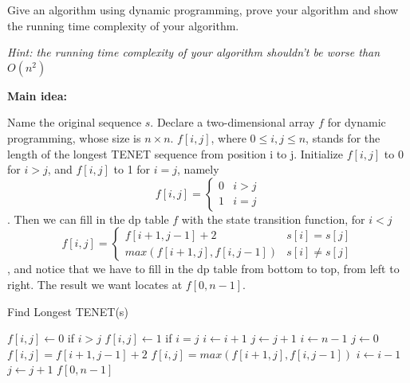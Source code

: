 \documentclass{article}
\begin{document}
Give an algorithm using dynamic programming, prove your algorithm and  show the running time complexity of your algorithm.

\textit{Hint: the running time complexity of your algorithm shouldn't be worse than $O(n^{2})$}

\pagebreak

\textbf{Main idea:}

Name the original sequence $s$. Declare a two-dimensional array $f$ for dynamic programming, whose size is $n\times n$. $f[i,j]$, where $0\leq i,j\leq n$, stands for the length of the longest TENET sequence from position i to j.
Initialize $f[i,j]$ to 0 for $i>j$, and $f[i,j]$ to 1 for $i=j$, namely $$f[i,j]=\begin{cases}
		0 & i>j \\
		1 & i=j
	\end{cases}$$. Then we can fill in the dp table $f$ with the state transition function, for $i<j$ $$f[i,j]=\begin{cases}
		f[i+1,j-1]+2           & s[i]=s[j]     \\
		max(f[i+1,j],f[i,j-1]) & s[i]\neq s[j]
	\end{cases}$$
, and notice that we have to fill in the dp table from bottom to top, from left to right. The result we want locates at $f[0,n-1]$.
\begin{algorithm}
	\caption{Find Longest TENET(s)}
	\label{alg2}
	\color{blue}
	\begin{algorithmic}
		\STATE $f[i,j]\gets 0$ if $i>j$
		\STATE $f[i,j]\gets 1$ if $i=j$
		\STATE $i\gets i+1$
		\STATE $j\gets j+1$
		\ENDWHILE
		\ENDWHILE
		\STATE $i\gets n-1$
		\STATE $j\gets 0$
		\STATE $f[i,j]=f[i+1,j-1]+2$
		\ELSE
		\STATE $f[i,j]=max(f[i+1,j],f[i,j-1])$
		\ENDIF
		\ENDIF
		\STATE $i\gets i-1$
		\STATE $j\gets j+1$
		\ENDWHILE
		\ENDWHILE
		\RETURN $f[0,n-1]$
	\end{algorithmic}
\end{algorithm}

\pagebreak
\end{document}

